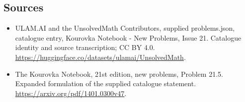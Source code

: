 \documentclass[11pt,a4paper]{article}
\begin{document}
\subsection{Sources}
\begin{itemize}
\item[S1] ULAM.AI and the UnsolvedMath Contributors, supplied problems.json, catalogue entry, Kourovka Notebook - New Problems, Issue 21. Catalogue identity and source transcription; CC BY 4.0.
\url{https://huggingface.co/datasets/ulamai/UnsolvedMath}.
\item[S2] The Kourovka Notebook, 21st edition, new problems, Problem 21.5. Expanded formulation of the supplied catalogue statement.
\url{https://arxiv.org/pdf/1401.0300v47}.
\end{itemize}
\end{document}
